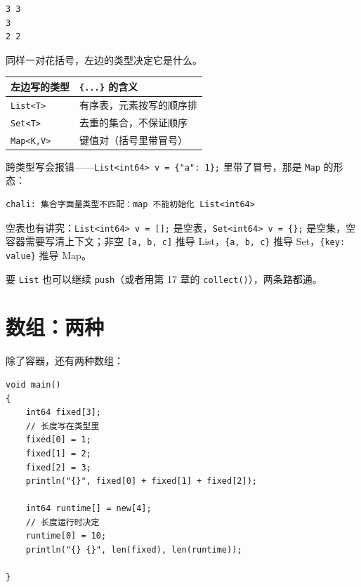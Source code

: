 \par
\medskip
\begin{lstlisting}[style=out]
3 3
3
2 2
\end{lstlisting}
\par
\medskip

同样一对花括号，左边的类型决定它是什么。

\begin{center}
\begin{tabular}{ll}
\toprule
左边写的类型 & \texttt{\{.\allowbreak{}.\allowbreak{}.\allowbreak{}\}} 的含义 \\
\midrule
\texttt{List<\allowbreak{}T>\allowbreak{}} & 有序表，元素按写的顺序排 \\
\texttt{Set<\allowbreak{}T>\allowbreak{}} & 去重的集合，不保证顺序 \\
\texttt{Map<\allowbreak{}K,\allowbreak{}V>\allowbreak{}} & 键值对（括号里带冒号） \\
\bottomrule
\end{tabular}
\end{center}

跨类型写会报错——\texttt{List<\allowbreak{}int64>\allowbreak{} v =\allowbreak{} \{"a":\allowbreak{} 1\};} 里带了冒号，那是 \texttt{Map} 的形态：

\par
\medskip
\begin{lstlisting}[style=out]
chali: 集合字面量类型不匹配：map 不能初始化 List<int64>
\end{lstlisting}
\par
\medskip

空表也有讲究：\texttt{List<\allowbreak{}int64>\allowbreak{} v =\allowbreak{} [\allowbreak{}]\allowbreak{};} 是空表，\texttt{Set<\allowbreak{}int64>\allowbreak{} v =\allowbreak{} \{\};} 是空集，空容器需要写清上下文；非空 \texttt{[\allowbreak{}a,\allowbreak{} b,\allowbreak{} c]\allowbreak{}} 推导 List，\texttt{\{a,\allowbreak{} b,\allowbreak{} c\}} 推导 Set，\texttt{\{key:\allowbreak{} value\}} 推导 Map。

要 \texttt{List} 也可以继续 \texttt{push}（或者用第 17 章的 \texttt{collect(\allowbreak{})\allowbreak{}}），两条路都通。

\section{数组：两种}

除了容器，还有两种数组：

\par
\medskip
\begin{lstlisting}[style=chali]
void main()
{
    int64 fixed[3];
    // 长度写在类型里
    fixed[0] = 1;
    fixed[1] = 2;
    fixed[2] = 3;
    println("{}", fixed[0] + fixed[1] + fixed[2]);

    int64 runtime[] = new[4];
    // 长度运行时决定
    runtime[0] = 10;
    println("{} {}", len(fixed), len(runtime));

}
\end{lstlisting}
\par
\medskip

